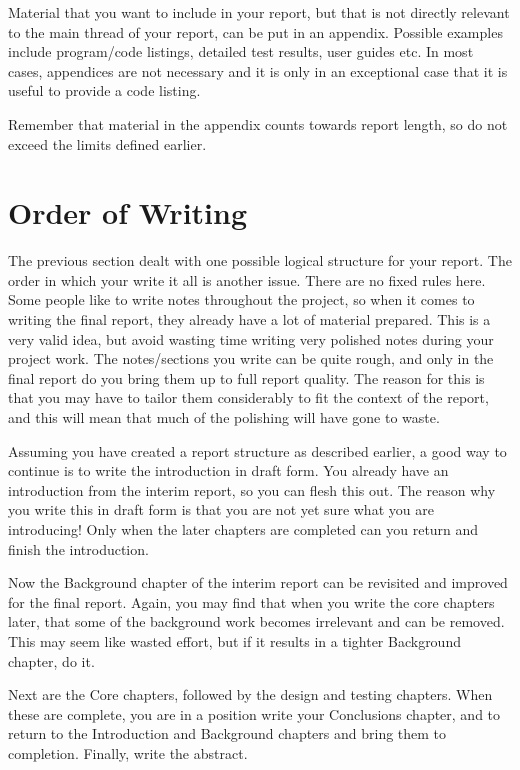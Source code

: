 \documentclass[]{final_report}
\begin{document}
Material that you want to include in your report, but that is not directly relevant to the main thread of your report, can be put in an appendix. Possible examples include program/code listings, detailed test results, user guides etc. In most cases, appendices are not necessary and it is only in an exceptional case that it is useful to provide a code listing.

Remember that material in the appendix counts towards report length, so do not exceed the limits defined earlier.


\section{Order of Writing}

The previous section dealt with one possible logical structure for your report. The order in which your write it all is another issue. There are no fixed rules here. Some people like to write notes throughout the project, so when it comes to writing the final report, they already have a lot of material prepared. This is a very valid idea, but avoid wasting time writing very polished notes during your project work. The notes/sections you write can be quite rough, and only in the final report do you bring them up to full report quality. The reason for this is that you may have to tailor them considerably to fit the context of the report, and this will mean that much of the polishing will have gone to waste.

Assuming you have created a report structure as described earlier, a good way to continue is to write the introduction in draft form. You already have an introduction from the interim report, so you can flesh this out. The reason why you write this in draft form is that you are not yet sure what you are introducing! Only when the later chapters are completed can you return and finish the introduction.

Now the Background chapter of the interim report can be revisited and improved for the final report. Again, you may find that when you write the core chapters later, that some of the background work becomes irrelevant and can be removed. This may seem like wasted effort, but if it results in a tighter Background chapter, do it.

Next are the Core chapters, followed by the design and testing chapters. When these are complete, you are in a position write your Conclusions chapter, and to return to the Introduction and Background chapters and bring them to completion. Finally, write the abstract.
\end{document}
